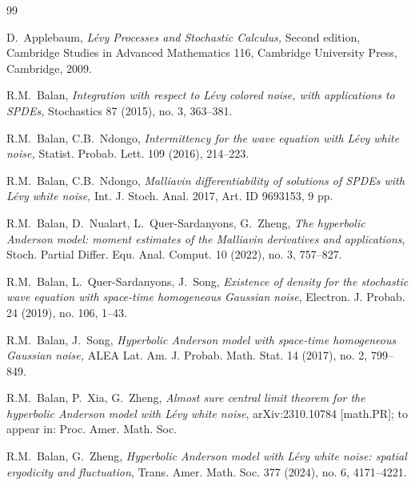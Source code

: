 \documentclass[letterpaper, 11pt,  reqno]{amsart}
\numberwithin{equation}{section}
\numberwithin{theorem}{section}
\begin{document}
\begin{thebibliography}{99}


D.~Applebaum,
{\it L\'evy Processes and Stochastic Calculus,}
Second edition, Cambridge Studies in Advanced Mathematics 116,
Cambridge University Press, Cambridge, 2009.


R.M.~Balan,
{\it Integration with respect to L\'evy colored noise,
with applications to SPDEs,}
 Stochastics 87 (2015), no. 3, 363--381.




R.M.~Balan,  C.B.~Ndongo,
{\it  Intermittency for the wave equation with L\'evy white noise,}
 Statist. Probab. Lett. 109 (2016), 214--223.


R.M.~Balan,  C.B.~Ndongo,
{\it Malliavin differentiability of solutions of SPDEs with L\'evy white noise,}
Int. J. Stoch. Anal. 2017, Art. ID 9693153, 9 pp.



R.M.~Balan, D.~Nualart, L.~Quer-Sardanyons, G.~Zheng,
{\it The hyperbolic Anderson model: moment estimates of
 the Malliavin derivatives and applications},
Stoch. Partial Differ. Equ. Anal. Comput. 10 (2022), no. 3, 757--827.


R.M.~Balan, L.~Quer-Sardanyons, J.~Song,
{\it Existence of density for the stochastic wave equation
with space-time homogeneous Gaussian noise},
Electron. J. Probab.  24 (2019), no. 106, 1--43.


R.M.~Balan,  J.~Song,  
{\it Hyperbolic Anderson model with space-time homogeneous Gaussian noise,}
ALEA Lat. Am. J. Probab. Math. Stat. 14 (2017), no. 2, 799--849.


R.M.~Balan, P.~Xia,  G.~Zheng,
{\it Almost sure central limit theorem for 
the hyperbolic Anderson model with L\'evy white noise},
arXiv:2310.10784 [math.PR]; to appear in:
Proc. Amer. Math. Soc. 


 


R.M.~Balan, G.~Zheng,
{\it Hyperbolic Anderson model with L\'evy white noise:
spatial ergodicity and fluctuation},
Trans. Amer. Math. Soc. 377  (2024),  no. 6, 
4171--4221.



\end{thebibliography}
\end{document}
